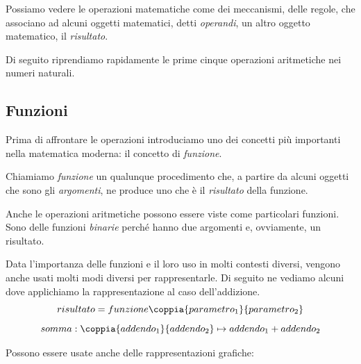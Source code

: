 Possiamo vedere le operazioni matematiche come dei meccanismi, delle regole, 
che associano ad alcuni oggetti matematici, detti \emph{operandi}, 
un altro oggetto matematico, il \emph{risultato}.

Di seguito riprendiamo rapidamente le prime cinque operazioni aritmetiche 
nei numeri naturali. 

\subsection{Funzioni}

Prima di affrontare le operazioni introduciamo uno dei concetti più importanti
nella matematica moderna: il concetto di \emph{funzione}.

\begin{definizione}{}{}
Chiamiamo \emph{funzione} un qualunque procedimento che, 
a partire da alcuni oggetti che sono gli \emph{argomenti}, 
ne produce uno che è il \emph{risultato} della funzione.
\end{definizione}

Anche le operazioni aritmetiche possono essere viste come particolari
funzioni. Sono delle funzioni \emph{binarie} perché hanno due argomenti e,
ovviamente, un risultato.

Data l'importanza delle funzioni e il loro uso in molti contesti diversi, 
vengono anche usati molti modi diversi per rappresentarle. 
Di seguito ne vediamo alcuni dove applichiamo la rappresentazione al caso
dell'addizione.
\[risultato = funzione \coppia{parametro_1}{parametro_2}\]
\[somma: \coppia{addendo_1}{addendo_2} \mapsto addendo_1 + addendo_2\]

\pagebreak %
Possono essere usate anche delle rappresentazioni grafiche:

